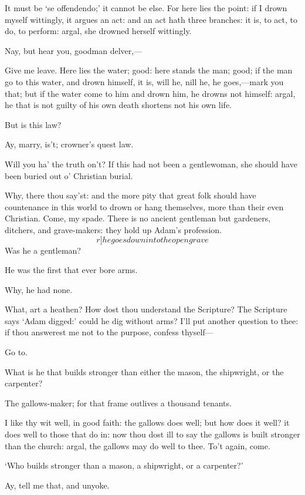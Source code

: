 \documentclass[11pt]{book}
\begin{document}
	It must be `se offendendo;' it cannot be else. For
	here lies the point:  if I drown myself wittingly,
	it argues an act: and an act hath three branches: it
	is, to act, to do, to perform: argal, she drowned
	herself wittingly.

	Nay, but hear you, goodman delver,---

	Give me leave. Here lies the water; good: here
	stands the man; good; if the man go to this water,
	and drown himself, it is, will he, nill he, he
	goes,---mark you that; but if the water come to him
	and drown him, he drowns not himself: argal, he
	that is not guilty of his own death shortens not his own life.

	But is this law?

	Ay, marry, is't; crowner's quest law.

	Will you ha' the truth on't? If this had not been
	a gentlewoman, she should have been buried out o'
	Christian burial.

	Why, there thou say'st: and the more pity that
	great folk should have countenance in this world to
	drown or hang themselves, more than their even
	Christian. Come, my spade. There is no ancient
	gentleman but gardeners, ditchers, and grave-makers:
	they hold up Adam's profession.
   \[r]he goes down into the open grave\]
	Was he a gentleman?

	He was the first that ever bore arms.

	Why, he had none.

	What, art a heathen? How dost thou understand the
	Scripture? The Scripture says `Adam digged:'
	could he dig without arms? I'll put another
	question to thee: if thou answerest me not to the
	purpose, confess thyself---

	Go to.

	What is he that builds stronger than either the
	mason, the shipwright, or the carpenter?

	The gallows-maker; for that frame outlives a
	thousand tenants.

	I like thy wit well, in good faith: the gallows
	does well; but how does it well? it does well to
	those that do in: now thou dost ill to say the
	gallows is built stronger than the church: argal,
	the gallows may do well to thee. To't again, come.

	`Who builds stronger than a mason, a shipwright, or
	a carpenter?'

	Ay, tell me that, and unyoke.
\end{document}
